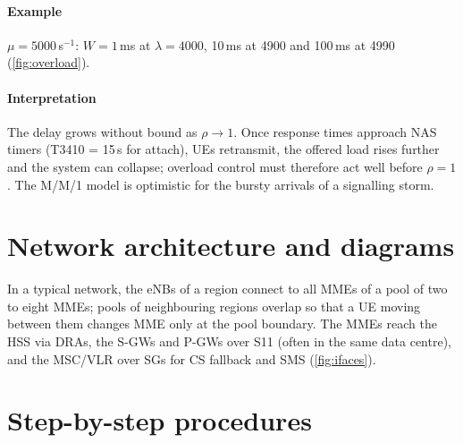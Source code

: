\documentclass[11pt,a4paper]{article}
\begin{document}
\paragraph{Example} $\mu = 5000$\,s$^{-1}$: $W = 1$\,ms at $\lambda = 4000$, 10\,ms at 4900 and 100\,ms at 4990
(\cref{fig:overload}).
\paragraph{Interpretation} The delay grows without bound as $\rho\to1$. Once response times approach NAS
timers (T3410 = 15\,s for attach), UEs retransmit, the offered load rises further and the system can
collapse; overload control must therefore act well before $\rho = 1$. The M/M/1 model is optimistic for
the bursty arrivals of a signalling storm.

\begin{acnfigure}
  \caption{Mean response time of an M/M/1 signalling processor versus load (\cref{eq:mm1}).}
  \label{fig:overload}
\end{acnfigure}

\section{Network architecture and diagrams}
In a typical network, the eNBs of a region connect to all MMEs of a pool of two to eight MMEs; pools of
neighbouring regions overlap so that a UE moving between them changes MME only at the pool boundary.
The MMEs reach the HSS via DRAs, the S-GWs and P-GWs over S11 (often in the same data centre), and the
MSC/VLR over SGs for CS fallback and SMS (\cref{fig:ifaces}).

\section{Step-by-step procedures}
\end{document}
